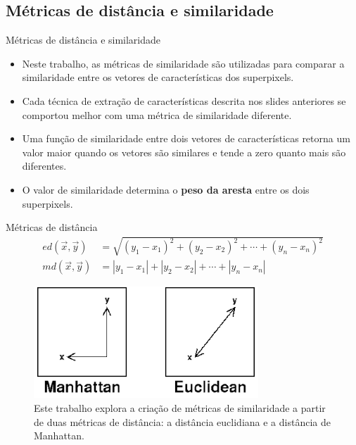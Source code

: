 \documentclass{templatebeamerufc/libs/ufc_format}
\begin{document}
\subsection{Métricas de distância e similaridade}

\begin{frame}{Métricas de distância e similaridade}
\begin{itemize}
  \item Neste trabalho, as métricas de similaridade são utilizadas para comparar a
similaridade entre os vetores de características dos superpixels.
  \item Cada técnica de extração de características descrita nos
slides anteriores se comportou melhor com uma métrica de similaridade
diferente.
  \item Uma função de similaridade entre dois vetores de
características retorna um valor maior quando os vetores são similares
e tende a zero quanto mais são diferentes.
 \item O valor de similaridade determina o \textbf{peso da aresta} entre os dois superpixels.
\end{itemize}
\end{frame}

\begin{frame}{Métricas de distância}
  \begin{equation*}\label{eq:distancias}
    \begin{aligned}
      ed(\vec{x}, \vec{y}) &= \sqrt{{(y_1-x_1)}^2 + {(y_2-x_2)}^2 + \cdots + {(y_n-x_n)}^2} \\
      md(\vec{x}, \vec{y}) &= |y_1-x_1| + |y_2-x_2| + \cdots + |y_n-x_n|
    \end{aligned}
  \end{equation*}
  \begin{figure}[!h]
    \centering
    \caption{
      Este trabalho explora a criação de métricas de similaridade a
      partir de duas métricas de distância: a distância euclidiana e a
      distância de Manhattan.
    }
    \includegraphics[scale=0.5]{figuras/manhattan-vs-euclidean}
  \end{figure}
\end{frame}
\end{document}
